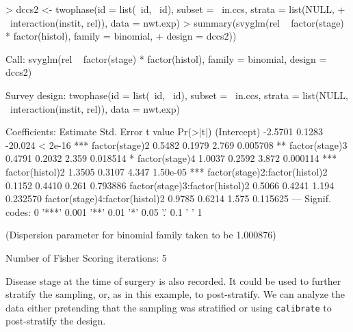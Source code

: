 \documentclass{article}
\begin{document}
\begin{Schunk}
\begin{Sinput}
> dccs2 <- twophase(id = list(~id, ~id), subset = ~in.ccs, strata = list(NULL, 
+     ~interaction(instit, rel)), data = nwt.exp)
> summary(svyglm(rel ~ factor(stage) * factor(histol), family = binomial, 
+     design = dccs2))
\end{Sinput}
\begin{Soutput}
Call:
svyglm(rel ~ factor(stage) * factor(histol), family = binomial, 
    design = dccs2)

Survey design:
twophase(id = list(~id, ~id), subset = ~in.ccs, strata = list(NULL, 
    ~interaction(instit, rel)), data = nwt.exp)

Coefficients:
                               Estimate Std. Error t value Pr(>|t|)    
(Intercept)                     -2.5701     0.1283 -20.024  < 2e-16 ***
factor(stage)2                   0.5482     0.1979   2.769 0.005708 ** 
factor(stage)3                   0.4791     0.2032   2.359 0.018514 *  
factor(stage)4                   1.0037     0.2592   3.872 0.000114 ***
factor(histol)2                  1.3505     0.3107   4.347 1.50e-05 ***
factor(stage)2:factor(histol)2   0.1152     0.4410   0.261 0.793886    
factor(stage)3:factor(histol)2   0.5066     0.4241   1.194 0.232570    
factor(stage)4:factor(histol)2   0.9785     0.6214   1.575 0.115625    
---
Signif. codes:  0 '***' 0.001 '**' 0.01 '*' 0.05 '.' 0.1 ' ' 1 

(Dispersion parameter for binomial family taken to be 1.000876)

Number of Fisher Scoring iterations: 5
\end{Soutput}
\end{Schunk}

Disease stage at the time of surgery is also recorded. It could be
used to further stratify the sampling, or, as in this example, to
post-stratify.  We can analyze the data either pretending that the
sampling was stratified or using \texttt{calibrate} to post-stratify
the design.
\end{document}

